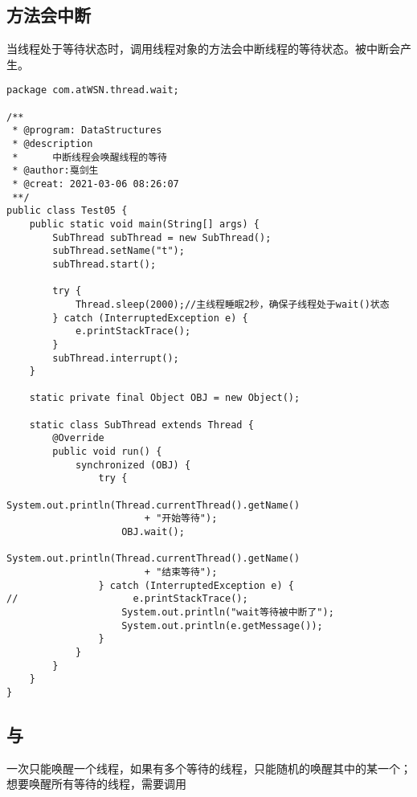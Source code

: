 \documentclass[a4paper]{report}
\begin{document}
\subsection{方法会中断}
当线程处于等待状态时，调用线程对象的方法会中断线程的等待状态。被中断会产生。

\begin{Verbatim}[frame=single,numbersep=5pt,xleftmargin=1.5em,xrightmargin=1.5em]
package com.atWSN.thread.wait;

/**
 * @program: DataStructures
 * @description
 *      中断线程会唤醒线程的等待
 * @author:戛剑生
 * @creat: 2021-03-06 08:26:07
 **/
public class Test05 {
    public static void main(String[] args) {
        SubThread subThread = new SubThread();
        subThread.setName("t");
        subThread.start();

        try {
            Thread.sleep(2000);//主线程睡眠2秒，确保子线程处于wait()状态
        } catch (InterruptedException e) {
            e.printStackTrace();
        }
        subThread.interrupt();
    }

    static private final Object OBJ = new Object();

    static class SubThread extends Thread {
        @Override
        public void run() {
            synchronized (OBJ) {
                try {
                    System.out.println(Thread.currentThread().getName()
                        + "开始等待");
                    OBJ.wait();
                    System.out.println(Thread.currentThread().getName()
                        + "结束等待");
                } catch (InterruptedException e) {
//                    e.printStackTrace();
                    System.out.println("wait等待被中断了");
                    System.out.println(e.getMessage());
                }
            }
        }
    }
}\end{Verbatim}
\subsection{与}
一次只能唤醒一个线程，如果有多个等待的线程，只能随机的唤醒其中的某一个；想要唤醒所有等待的线程，需要调用
\end{document}
